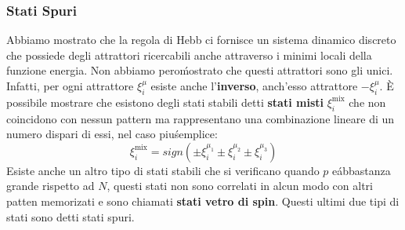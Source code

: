 \documentclass[12pt, a4paper]{book}
\theoremstyle{theorem}
\begin{document}
				\subsubsection{Stati Spuri}
					Abbiamo mostrato che la regola di Hebb ci fornisce un sistema dinamico discreto che possiede degli attrattori ricercabili anche attraverso i minimi locali della funzione energia.
					Non abbiamo pero\' mostrato che questi attrattori sono gli unici. Infatti, per ogni attrattore $\xi_i^\mu$ esiste anche l'{\bf inverso}, anch'esso attrattore $-\xi_i^\mu$.
					È possibile mostrare che esistono degli stati stabili detti {\bf stati misti} $\xi_i^{\text{mix}}$ che non coincidono con nessun pattern ma rappresentano una combinazione lineare di un numero dispari di essi, nel caso piu\' semplice:
					\begin{equation}
						\xi_i^{\text{mix}} = sign(\pm \xi_i^{\mu_1} \pm \xi_i^{\mu_2} \pm \xi_i^{\mu_3})
					\end{equation}
					Esiste anche un altro tipo di stati stabili che si verificano quando $p$ e\' abbastanza grande rispetto ad $N$, questi stati non sono correlati in alcun modo con altri patten memorizati e sono chiamati {\bf stati vetro di spin}.
					Questi ultimi due tipi di stati sono detti stati spuri.
\end{document}
